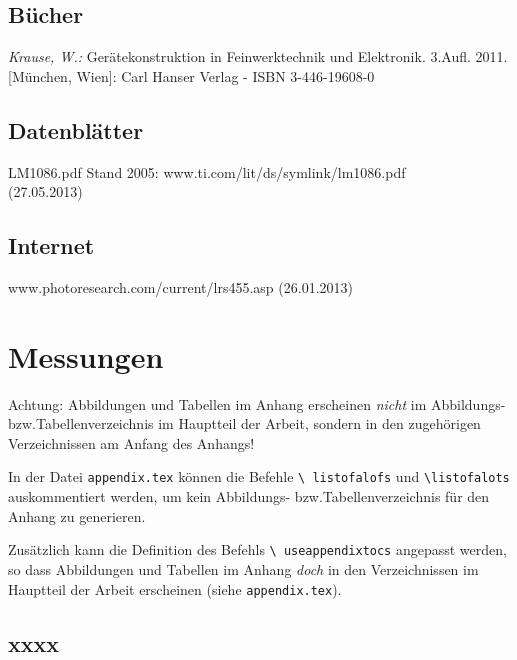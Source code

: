 \documentclass[%
  paper=a4,
  fontsize=12pt,
  twoside=false,
  headsepline=true,
  numbers=noenddot]{scrartcl}
\begin{document}
\clearpage
{}
{}
\begin{thebibliography}{999}	%
\normalsize

\subsection*{Bücher}	%
 \textit{Krause, W.:} Gerätekonstruktion in Feinwerktechnik und Elektronik. 3.Aufl. 2011. [München, Wien]: Carl Hanser Verlag  - ISBN 3-446-19608-0


\subsection*{Datenblätter}	%

 LM1086.pdf Stand 2005: www.ti.com/lit/ds/symlink/lm1086.pdf\\ (27.05.2013)


\subsection*{Internet}	%

 www.photoresearch.com/current/lrs455.asp (26.01.2013)


\end{thebibliography}

\clearpage
\appendix %

\label{SecA}
\section{Messungen}

Achtung: Abbildungen und Tabellen im Anhang erscheinen \emph{nicht} im
Abbildungs- bzw.\@ Tabellenverzeichnis im Hauptteil der Arbeit, sondern in den
zugehörigen Verzeichnissen am Anfang des Anhangs!

In der Datei \texttt{appendix.tex} können die Befehle \texttt{\textbackslash
listofalofs} und \texttt{\textbackslash listofalots} auskommentiert werden, um
kein Abbildungs- bzw.\@ Tabellenverzeichnis für den Anhang zu generieren.

Zusätzlich kann die Definition des Befehls \texttt{\textbackslash
useappendixtocs} angepasst werden, so dass Abbildungen und Tabellen im Anhang
\emph{doch} in den Verzeichnissen im Hauptteil der Arbeit erscheinen (siehe
\texttt{appendix.tex}).


\label{SecA1}
\subsection{xxxx}
%

\end{document}
